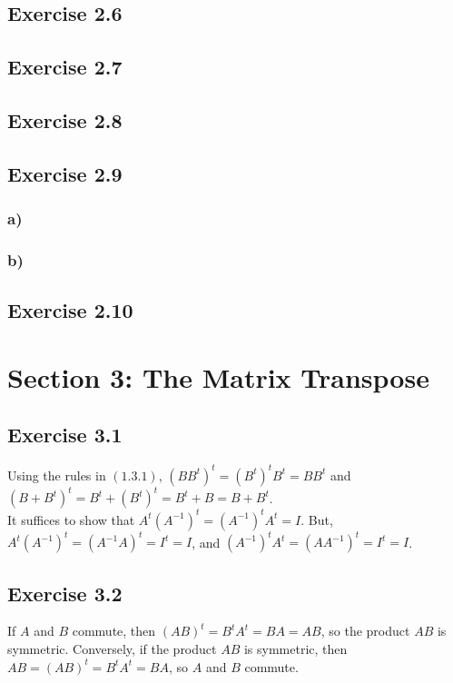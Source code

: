 \documentclass{article}
\begin{document}
\subsection*{Exercise 2.6}
\subsection*{Exercise 2.7}
\subsection*{Exercise 2.8}
\subsection*{Exercise 2.9}

\subsubsection*{a)}
\subsubsection*{b)}

\subsection*{Exercise 2.10}

\section*{Section 3: The Matrix Transpose}

\subsection*{Exercise 3.1}

Using the rules in $(1.3.1)$, $(BB^t)^t = (B^t)^tB^t = BB^t$ and $(B+B^t)^t = B^t + (B^t)^t = B^t + B = B + B^t$.\\

It suffices to show that $A^t(A^{-1})^t=(A^{-1})^tA^t=I$. But, $A^t(A^{-1})^t=(A^{-1}A)^t = I^t = I$, and $(A^{-1})^tA^t = (AA^{-1})^t = I^t = I$.

\subsection*{Exercise 3.2}

If $A$ and $B$ commute, then $(AB)^t=B^tA^t=BA=AB$, so the product $AB$ is symmetric. Conversely, if the product $AB$ is symmetric, then $AB=(AB)^t=B^tA^t=BA$, so $A$ and $B$ commute.
\end{document}
